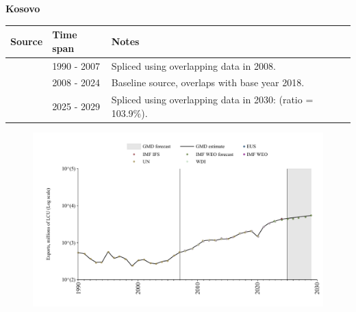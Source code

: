 \documentclass[12pt,a4paper,landscape]{article}
\begin{document}
\begin{adjustbox}{max totalsize={\paperwidth}{\paperheight},center}
\begin{minipage}[t][\textheight][t]{\textwidth}
\vspace*{0.5cm}
{}
\begin{center}
{\Large\bfseries Kosovo}
\end{center}
\vspace{0.5cm}
\begin{table}[H]
\centering
\small
\begin{tabular}{|l|l|l|}
\hline
\textbf{Source} & \textbf{Time span} & \textbf{Notes} \\
\hline
\rowcolor{white}\cite{UN}& 1990 - 2007 &Spliced using overlapping data in 2008.\\
\rowcolor{lightgray}\cite{EUS}& 2008 - 2024 &Baseline source, overlaps with base year 2018.\\
\rowcolor{white}\cite{IMF_WEO_forecast}& 2025 - 2029 &Spliced using overlapping data in 2030: (ratio = 103.9\%).\\
\hline
\end{tabular}
\end{table}
\begin{figure}[H]
\centering
\includegraphics[width=\textwidth,height=0.6\textheight,keepaspectratio]{graphs/XKX_exports.pdf}
\end{figure}
\end{minipage}
\end{adjustbox}
\end{document}
